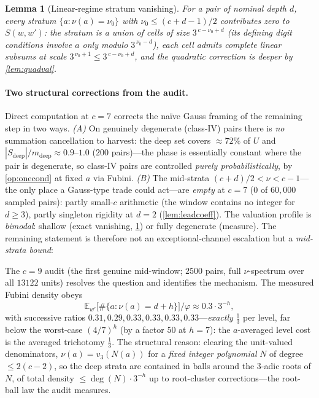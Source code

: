 \documentclass[11pt]{article}
\newcommand{\E}{\mathbb{E}}
\theoremstyle{plain}
\newtheorem{lemma}{Lemma}
\theoremstyle{definition}
\theoremstyle{remark}
\begin{document}
\begin{lemma}[Linear-regime stratum vanishing]\label{lem:stratvan}
For a pair of nominal depth $d$, every stratum
$\{a:\nu(a)=\nu_0\}$ with $\nu_0\le(c+d-1)/2$ contributes \emph{zero}
to $S(w,w')$: the stratum is a union of cells of size $3^{\,c-\nu_0+d}$
(its defining digit conditions involve $a$ only modulo
$3^{\,\nu_0-d}$), each cell admits complete linear subsums at scale
$3^{\,\nu_0+1}\le3^{\,c-\nu_0+d}$, and the quadratic correction is
deeper by \cref{lem:quadval}. 
\end{lemma}

\paragraph{Two structural corrections from the audit.} Direct computation
at $c=7$ corrects the na\"ive Gauss framing of the remaining step in two
ways. \emph{(A)} On genuinely degenerate (class-IV) pairs there is
\emph{no} summation cancellation to harvest: the deep set covers
$\approx72\%$ of $U$ and $|S_{\mathrm{deep}}|/m_{\mathrm{deep}}\approx
0.9$--$1.0$ ($200$ pairs)---the phase is essentially constant where the
pair is degenerate, so class-IV pairs are controlled \emph{purely
probabilistically}, by \cref{op:onecond} at fixed $a$ via Fubini.
\emph{(B)} The mid-strata $(c+d)/2<\nu<c-1$---the only place a
Gauss-type trade could act---are \emph{empty} at $c=7$ ($0$ of $60{,}000$
sampled pairs): partly small-$c$ arithmetic (the window contains no
integer for $d\ge3$), partly singleton rigidity at $d=2$
(\cref{lem:leadcoeff}). The valuation profile is \emph{bimodal}: shallow
(exact vanishing, \cref{lem:stratvan}) or fully degenerate (measure). The
remaining statement is therefore not an exceptional-channel escalation but
a \emph{mid-strata bound}:

The $c=9$ audit (the first genuine mid-window; $2500$ pairs, full
$\nu$-spectrum over all $13122$ units) resolves the question and
identifies the mechanism. The measured Fubini density obeys
\[
\E_{w'}\bigl[\#\{a:\nu(a)=d+h\}\bigr]/\varphi
\approx0.3\cdot3^{-h},
\]
with successive ratios $0.31,0.29,0.33,0.33,0.33,0.33$---\emph{exactly}
$\tfrac13$ per level, far below the worst-case $(4/7)^h$ (by a factor
$50$ at $h=7$): the $a$-averaged level cost is the averaged trichotomy
$\tfrac13$. The structural reason: clearing the unit-valued denominators,
$\nu(a)=v_3(N(a))$ for a \emph{fixed integer polynomial} $N$ of degree
$\le2(c-2)$, so the deep strata are contained in balls around the
$3$-adic roots of $N$, of total density $\le\deg(N)\cdot3^{-h}$ up to
root-cluster corrections---the root-ball law the audit measures.
\end{document}

